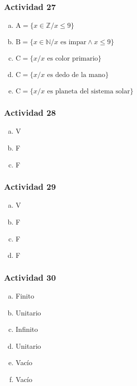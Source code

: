 \documentclass[a4paper, twocolumn]{article}
\begin{document}
\subsubsection*{Actividad 27}
\begin{enumerate}[a)]
\item $\text{A}=\{x \in \mathbb{Z} / x\leq 9 \}$
\item $\text{B}=\{x \in \mathbb{N} / x \mbox{ es impar} \wedge x \leq 9 \}$

\item $\text{C}=\{x / x \mbox{ es color primario}\}$

\item $\text{C}=\{x / x \mbox{ es dedo de la mano}\}$

\item $\text{C}=\{x / x \mbox{ es planeta del sistema solar}\}$


\end{enumerate}

\subsubsection*{Actividad 28}
\begin{enumerate}[a)]
\item V
\item F
\item F

\end{enumerate}

\subsubsection*{Actividad 29}
\begin{enumerate}[a)]
\item V
\item F
\item F
\item F
\end{enumerate}

\subsubsection*{Actividad 30}
\begin{enumerate}[a)]
\item Finito
\item Unitario
\item Infinito
\item Unitario
\item Vacío
\item Vacío
\end{enumerate}
\end{document}
